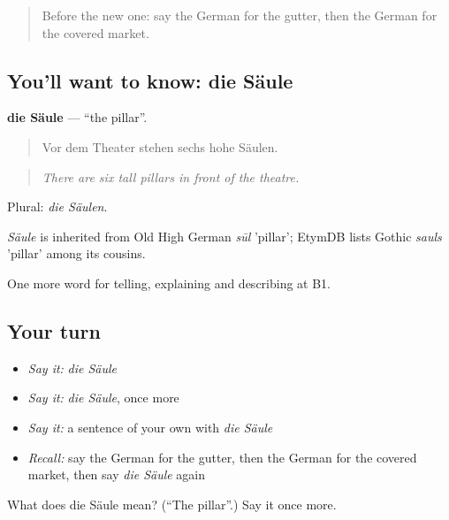 \label{lesson:GE-C441-saeule}



\begin{quote}
Before the new one: say the German for the gutter, then the German for the covered market.
\end{quote}

\subsection*{You'll want to know: die Säule}
\textbf{die Säule} — \textquotedblleft{}the pillar\textquotedblright{}.

\begin{quote}
Vor dem Theater stehen sechs hohe Säulen.
\end{quote}

\begin{quote}
\emph{There are six tall pillars in front of the theatre.}
\end{quote}

Plural: \emph{die Säulen}.

\begin{cousinweb}
\emph{Säule} is inherited from Old High German \emph{sūl} 'pillar'; EtymDB lists Gothic \emph{sauls} 'pillar' among its cousins.
\end{cousinweb}

\begin{grammarlens}[title={What you've built}]
One more word for telling, explaining and describing at B1.
\end{grammarlens}

\subsection*{Your turn}
\begin{itemize}
\raggedright
  \item \emph{Say it:} \emph{die Säule}
  \item \emph{Say it:} \emph{die Säule}, once more
  \item \emph{Say it:} a sentence of your own with \emph{die Säule}
  \item \emph{Recall:} say the German for the gutter, then the German for the covered market, then say \emph{die Säule} again
\end{itemize}

\begin{tcolorbox}[breakable,colback=teal!4,colframe=teal!35!black,title={Before you move on}]
What does die Säule mean? (\textquotedblleft{}The pillar\textquotedblright{}.) Say it once more.
\end{tcolorbox}

